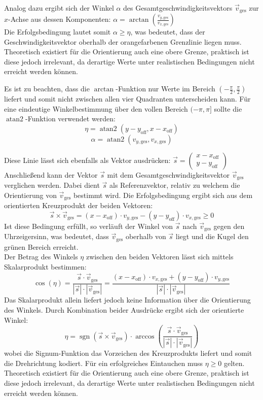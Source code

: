 \\
Analog dazu ergibt sich der Winkel $\alpha$ des Gesamtgeschwindigkeitsvektors $\vec{v}_{\text{ges}}$ zur $x$-Achse aus dessen Komponenten: $\alpha = \arctan\left(\tfrac{v_{y,\text{ges}}}{v_{x,\text{ges}}}\right)$
\\
Die Erfolgsbedingung lautet somit $\alpha \geq \eta$, was bedeutet, dass der Geschwindigkeitsvektor oberhalb der orangefarbenen Grenzlinie liegen muss.
\\
Theoretisch existiert für die Orientierung auch eine obere Grenze, praktisch ist diese jedoch irrelevant, da derartige Werte unter realistischen Bedingungen nicht erreicht werden können.

\iffalse
Es ist zu beachten, dass die $\arctan$-Funktion nur Werte im Bereich $(-\frac{\pi}{2}, \frac{\pi}{2})$ liefert und somit nicht zwischen allen vier Quadranten unterscheiden kann. Für eine eindeutige Winkelbestimmung über den vollen Bereich $(-\pi, \pi]$ sollte die $\operatorname{atan2}$-Funktion verwendet werden:
\[\eta = \operatorname{atan2}(y-y_{\text{off}}, x-x_{\text{off}})\]
\[\alpha = \operatorname{atan2}(v_{y,\text{ges}}, v_{x,\text{ges}})\]



Diese Linie lässt sich ebenfalls als Vektor ausdrücken:
$\vec{s} = \left(\begin{smallmatrix} x-x_{\text{off}} \\[2pt] y-y_{\text{off}} \end{smallmatrix}\right)$
Anschließend kann der Vektor $\vec{s}$ mit dem Gesamtgeschwindigkeitsvektor $\vec{v}_{\text{ges}}$ verglichen werden. Dabei dient $\vec{s}$ als Referenzvektor, relativ zu welchem die Orientierung von $\vec{v}_{\text{ges}}$ bestimmt wird. Die Erfolgsbedingung ergibt sich aus dem orientierten Kreuzprodukt der beiden Vektoren:
\[\vec{s} \times \vec{v}_{\text{ges}} = (x-x_{\text{off}}) \cdot v_{y,\text{ges}} - (y-y_{\text{off}}) \cdot v_{x,\text{ges}} \geq 0\]
Ist diese Bedingung erfüllt, so verläuft der Winkel von $\vec{s}$ nach $\vec{v}_{\text{ges}}$ gegen den Uhrzeigersinn, was bedeutet, dass $\vec{v}_{\text{ges}}$ oberhalb von $\vec{s}$ liegt und die Kugel den grünen Bereich erreicht. 
\\
Der Betrag des Winkels $\eta$ zwischen den beiden Vektoren lässt sich mittels Skalarprodukt bestimmen:
\[\cos(\eta) = \frac{\vec{s} \cdot \vec{v}_{\text{ges}}}{|\vec{s}| \cdot |\vec{v}_{\text{ges}}|} = \frac{(x-x_{\text{off}}) \cdot v_{x,\text{ges}} + (y-y_{\text{off}}) \cdot v_{y,\text{ges}}}{|\vec{s}| \cdot |\vec{v}_{\text{ges}}|}\]
Das Skalarprodukt allein liefert jedoch keine Information über die Orientierung des Winkels. Durch Kombination beider Ausdrücke ergibt sich der orientierte Winkel:
\[\eta = \operatorname{sgn}\left(\vec{s} \times \vec{v}_{\text{ges}}\right) \cdot \arccos\left(\frac{\vec{s} \cdot \vec{v}_{\text{ges}}}{|\vec{s}| \cdot |\vec{v}_{\text{ges}}|}\right)\]
wobei die Signum-Funktion das Vorzeichen des Kreuzprodukts liefert und somit die Drehrichtung kodiert. Für ein erfolgreiches Eintauchen muss $\eta \geq 0$ gelten. Theoretisch existiert für die Orientierung auch eine obere Grenze, praktisch ist diese jedoch irrelevant, da derartige Werte unter realistischen Bedingungen nicht erreicht werden können.

